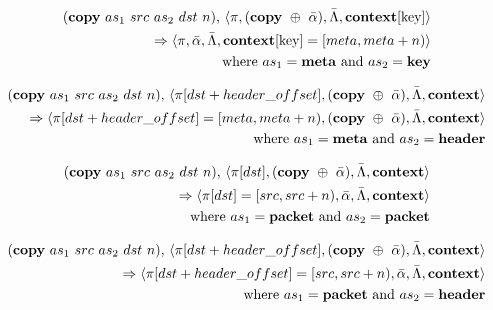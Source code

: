 \begin{equation}
\begin{split}
  (\textrm{\textbf{copy}} \ as_1 \ src \ as_2 \ dst \ n)
  \textrm{,} \ \langle \pi, (\textrm{\textbf{copy}} \ \oplus \ \bar \alpha), \bar \Lambda, \textrm{\textbf{context}[key]} \rangle \\
  \Rightarrow
  \langle \pi, \bar \alpha, \bar \Lambda, \textrm{\textbf{context}[key]} = [meta, meta + n) \rangle \\
    \textrm{where} \ as_1 = \textrm{\textbf{meta} and } as_2 =
    \textrm{\textbf{key}}
\end{split}
\end{equation}

\begin{equation}
\begin{split}
  (\textrm{\textbf{copy}} \ as_1 \ src \ as_2 \ dst \ n)
  \textrm{,} \ \langle \pi[dst + header\_offset], (\textrm{\textbf{copy}} \ \oplus \ \bar \alpha), \bar \Lambda, \textrm{\textbf{context}} \rangle \\
  \Rightarrow
  \langle \pi[dst + header\_offset] = [meta, meta + n), (\textrm{\textbf{copy}} \ \oplus \ \bar \alpha), \bar \Lambda, \textrm{\textbf{context}} \rangle \\
    \textrm{where} \ as_1 = \textrm{\textbf{meta} and } as_2 =
    \textrm{\textbf{header}}
\end{split}
\end{equation}

\begin{equation}
\begin{split}
  (\textrm{\textbf{copy}} \ as_1 \ src \ as_2 \ dst \ n)
  \textrm{,} \ \langle \pi[dst], (\textrm{\textbf{copy}} \ \oplus \ \bar \alpha), \bar \Lambda, \textrm{\textbf{context}} \rangle \\
  \Rightarrow 
  \langle \pi[dst] = [src, src + n), \bar \alpha, \bar \Lambda, \textrm{\textbf{context}} \rangle \\
    \textrm{where} \ as_1 = \textrm{\textbf{packet} and } as_2 =
    \textrm{\textbf{packet}}
\end{split}
\end{equation}

\begin{equation}
\begin{split}
  (\textrm{\textbf{copy}} \ as_1 \ src \ as_2 \ dst \ n)
  \textrm{,} \ \langle \pi[dst + header\_offset], (\textrm{\textbf{copy}} \ \oplus \ \bar \alpha), \bar \Lambda, \textrm{\textbf{context}} \rangle \\
  \Rightarrow
  \langle \pi[dst + header\_offset] = [src, src + n), \bar \alpha, \bar \Lambda, \textrm{\textbf{context}} \rangle \\
    \textrm{where} \ as_1 = \textrm{\textbf{packet} and } as_2 =
    \textrm{\textbf{header}}
\end{split}
\end{equation}


